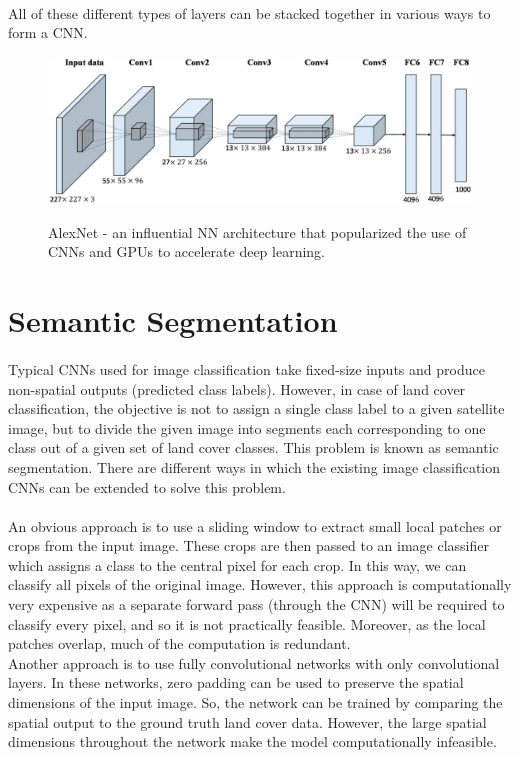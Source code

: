 \documentclass[12pt, a4paper]{report}
\begin{document}
\paragraph{}
All of these different types of layers can be stacked together in various ways to form a CNN.
\begin{figure}[h]
\centering
\includegraphics[width=\textwidth]{cnn3.jpg}
\caption{AlexNet - an influential NN architecture that popularized the use of CNNs and GPUs to accelerate deep learning.}\cite{alexnet, alexnetimg}
\end{figure}
\section{Semantic Segmentation}
\paragraph{}
Typical CNNs used for image classification take fixed-size inputs and produce non-spatial outputs (predicted class labels). However, in case of land cover classification, the objective is not to assign a single class label to a given satellite image, but to divide the given image into segments each corresponding to one class out of a given set of land cover classes. This problem is known as semantic segmentation. There are different ways in which the existing image classification CNNs can be extended to solve this problem.
\paragraph{}
An obvious approach is to use a sliding window to extract small local patches or crops from the input image. These crops are then passed to an image classifier which assigns a class to the central pixel for each crop. In this way, we can classify all pixels of the original image. However, this approach is computationally very expensive as a separate forward pass (through the CNN) will be required to classify every pixel, and so it is not practically feasible. Moreover, as the local patches overlap, much of the computation is redundant.\\
Another approach is to use fully convolutional networks with only convolutional layers. In these networks, zero padding can be used to preserve the spatial dimensions of the input image. So, the network can be trained by comparing the spatial output to the ground truth land cover data. However, the large spatial dimensions throughout the network make the model computationally infeasible. \cite{long2015fully, cs231n, unet}
\end{document}
